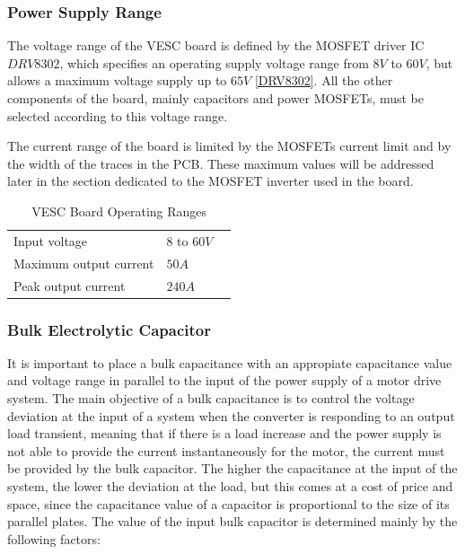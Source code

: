 \subsubsection{Power Supply Range}

The voltage range of the VESC board is defined by the \ac{MOSFET} driver \ac{IC} $DRV8302$, which specifies an operating supply voltage range from $8V$ to $60V$, but allows a maximum voltage supply up to $65V$ \ref{DRV8302}. All the other components of the board, mainly capacitors and power \ac{MOSFET}s, must be selected according to this voltage range.

The current range of the board is limited by the \ac{MOSFET}s current limit and by the width of the traces in the \ac{PCB}. These maximum values will be addressed later in the section dedicated to the \ac{MOSFET} inverter used in the board.

\begin{table}[]
\centering
\caption{VESC Board Operating Ranges}
\label{table:vesc_ranges}
\begin{tabular}{@{}lll@{}}
\toprule
Input voltage          	& $8$ to $60V$ 	\\
Maximum output current 		   	& $50A$		\\
Peak output current     & $240A$ 		\\
\bottomrule
\end{tabular}
\end{table}

\subsubsection{Bulk Electrolytic Capacitor}

It is important to place a bulk capacitance with an appropiate capacitance value and voltage range in parallel to the input of the power supply of a motor drive system. The main objective of a bulk capacitance is to control the voltage deviation at the input of a system when the converter is responding to an output load transient, meaning that if there is a load increase and the power supply is not able to provide the current instantaneously for the motor, the current must be provided by the bulk capacitor. The higher the capacitance at the input of the system, the lower the deviation at the load, but this comes at a cost of price and space, since the capacitance value of a capacitor is proportional to the size of its parallel plates. The value of the input bulk capacitor is determined mainly by the following factors:

